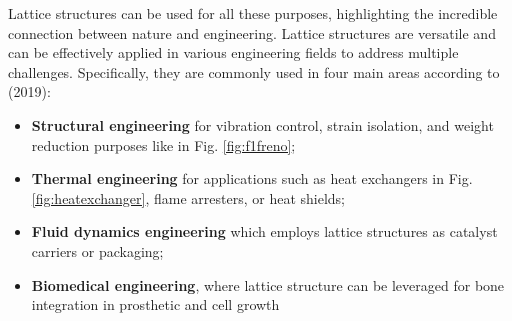 Lattice structures can be used for all these purposes, highlighting the incredible connection between nature and engineering. Lattice structures are versatile and can be effectively applied in various engineering fields to address multiple challenges. Specifically, they are commonly used in four main areas according to \citeauthor{bhate_classification_2019} (2019): 
\begin{itemize}
    \item \textbf{Structural engineering} for vibration control, strain isolation, and weight reduction purposes like in Fig. \ref{fig:f1freno};
    \item \textbf{Thermal engineering} for applications such as heat exchangers in Fig. \ref{fig:heatexchanger}, flame arresters, or heat shields;
    \item \textbf{Fluid dynamics engineering} which employs lattice structures as catalyst carriers or packaging;
    \item \textbf{Biomedical engineering}, where lattice structure can be leveraged for bone integration in prosthetic and cell growth
\end{itemize}
